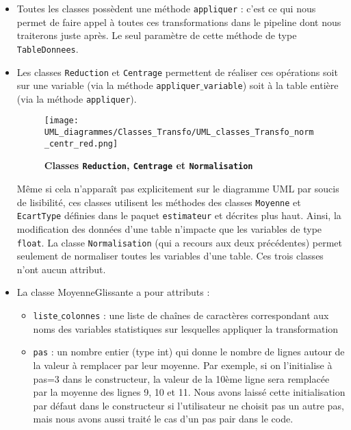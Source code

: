 \documentclass[11pt]{article}
\begin{document}
\begin{itemize}
    \item Toutes les classes possèdent une méthode \texttt{appliquer} : c'est ce qui nous permet de faire appel à toutes ces transformations dans le pipeline dont nous traiterons juste après. Le seul paramètre de cette méthode de type \texttt{TableDonnees}.
    
    \item Les classes \texttt{Reduction} et \texttt{Centrage} permettent de réaliser ces opérations soit sur une variable (via la méthode \texttt{appliquer$\_$variable}) soit à la table entière (via la méthode \texttt{appliquer}). 
    
    \begin{figure}[H]
    \caption{\textbf{Classes \texttt{Reduction}, \texttt{Centrage} et \texttt{Normalisation}}}
    \label{UML_classe_transfo_norm_centr_red}
    \centering
    \texttt{[image: UML\_diagrammes/Classes\_Transfo/UML\_classes\_Transfo\_norm\_centr\_red.png]}
    \end{figure}
    
    Même si cela n'apparaît pas explicitement sur le diagramme UML par soucis de lisibilité, ces classes utilisent les méthodes des classes \texttt{Moyenne} et \texttt{EcartType} définies dans le paquet \texttt{estimateur} et décrites plus haut. Ainsi, la modification des données d'une table n'impacte que les variables de type \texttt{float}. La classe  \texttt{Normalisation} (qui a recours aux deux précédentes) permet seulement de normaliser toutes les variables d'une table. Ces trois classes n'ont aucun attribut.
    

    
    \item La classe {MoyenneGlissante} a pour attributs :
    \begin{itemize}[label=, font=\small]
        \item \texttt{liste$\_$colonnes} : une liste de chaînes de caractères correspondant aux noms des variables statistiques sur lesquelles appliquer la transformation
        \item \texttt{pas} : un nombre entier (type int) qui donne le nombre de lignes autour de la valeur à remplacer par leur moyenne.
        Par exemple, si on l'initialise à pas=3 dans le constructeur, la valeur de la 10ème ligne sera remplacée par la moyenne des lignes 9, 10 et 11. Nous avons laissé cette initialisation par défaut dans le constructeur si l'utilisateur ne choisit pas un autre pas, mais nous avons aussi traité le cas d'un pas pair dans le code.
    \end{itemize}
    

\end{itemize}
\end{document}
